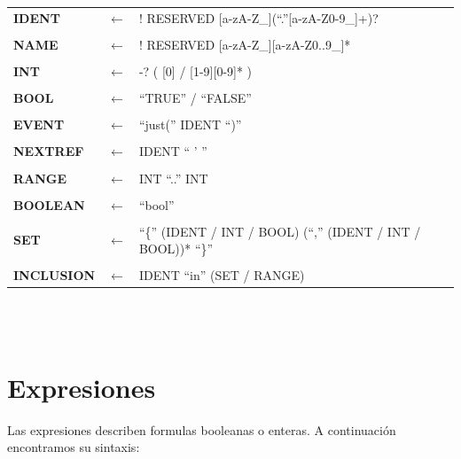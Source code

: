 \documentclass[titlepage, 12pt]{book}
\begin{document}
~\\\\
\begin{tabularx}{\textwidth}{>{\bfseries}llX}
IDENT & $\longleftarrow$ & ! RESERVED [a-zA-Z\_](``.''[a-zA-Z0-9\_]+)?\\\\
NAME & $\longleftarrow$ & ! RESERVED [a-zA-Z\_][a-zA-Z0..9\_]*\\\\
INT & $\longleftarrow$ & -? ( [0] / [1-9][0-9]* )\\\\
BOOL & $\longleftarrow$ & ``TRUE'' / ``FALSE''\\\\
EVENT & $\longleftarrow$ & ``just('' IDENT ``)''\\\\
NEXTREF & $\longleftarrow$ & IDENT `` ' ''\\\\
RANGE & $\longleftarrow$ & INT ``..'' INT\\\\
BOOLEAN & $\longleftarrow$ & ``bool''\\\\
SET & $\longleftarrow$ & ``\{'' (IDENT / INT / BOOL) (``,'' (IDENT / INT / BOOL))* ``\}''\\\\
INCLUSION & $\longleftarrow$ & IDENT ``in'' (SET / RANGE)\\
\end{tabularx}
~\\\\

\section{Expresiones}
Las expresiones describen formulas booleanas o enteras. A continuaci\'on encontramos su sintaxis:
\end{document}
